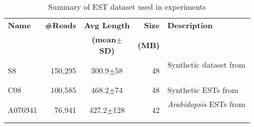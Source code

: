 \begin{table}[h]
  \caption{Summary of EST dataset used in experiments}
  \begin{center}
    \begin{tabular}{|l|r|c|r|p{1in}|}
      \hline

      {\bf Name} & {\bf \#Reads} & {\bf Avg Length}     & {\bf Size}  & {\bf Description}  \\
           &         & \bf{(mean$\pm$ SD)} & \bf{(MB)}  &   \\ \hline

      S8   & 150,295 & 300.9$\pm$58 & 48 & Synthetic dataset from ~\cite{james-18} \\ \hline

      C08  & 100,585 & 468.2$\pm$74 & 48 & Synthetic ESTs from ~\cite{hazelhurst-11} \\ \hline

      A076941 & 76,941 & 427.2$\pm$128 & 42 & \emph{Arabidopsis} ESTs from ~\cite{hazelhurst-11} \\ \hline
      
      \hline
    \end{tabular}\label{tab:est-ds}
  \end{center}
\end{table}

